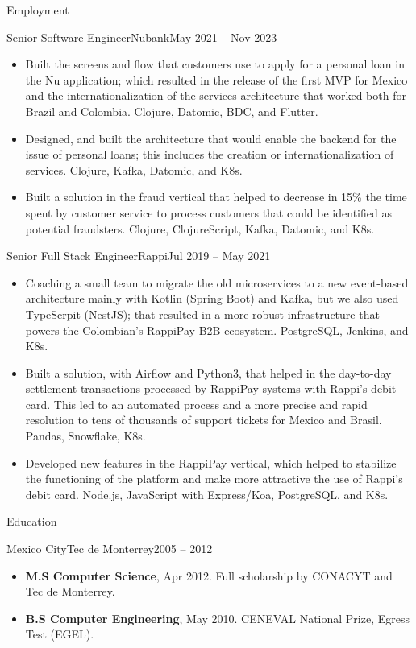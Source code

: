 \documentclass[calibri]{../mcdowell-cv/mcdowellcv}
\begin{document}
\begin{cvsection}{Employment}
		\begin{cvsubsection}{Senior Software Engineer}{Nubank}{May 2021 -- Nov 2023}
			\begin{itemize}
				\item Built the screens and flow that customers use to apply for a personal loan in the Nu application; which resulted in the release of the first MVP for Mexico and the internationalization of the services architecture that worked both for Brazil and Colombia. Clojure, Datomic, BDC, and Flutter.
				\item Designed, and built the architecture that would enable the backend for the issue of personal loans; this includes the creation or internationalization of services. Clojure, Kafka, Datomic, and K8s.
				\item Built a solution in the fraud vertical that helped to decrease in 15\% the time spent by customer service to process customers that could be identified as potential fraudsters. Clojure, ClojureScript, Kafka, Datomic, and K8s.
			\end{itemize}
		\end{cvsubsection}

		\begin{cvsubsection}{Senior Full Stack Engineer}{Rappi}{Jul 2019 -- May 2021}
			\begin{itemize}
				\item Coaching a small team to migrate the old microservices to a new event-based architecture mainly with Kotlin (Spring Boot) and Kafka, but we also used TypeScrpit (NestJS); that resulted in a more robust infrastructure that powers the Colombian's RappiPay B2B ecosystem. PostgreSQL, Jenkins, and K8s.
				\item Built a solution, with Airflow and Python3, that helped in the day-to-day settlement transactions processed by RappiPay systems with Rappi's debit card. This led to an automated process and a more precise and rapid resolution to tens of thousands of support tickets for Mexico and Brasil. Pandas, Snowflake, K8s.
				\item Developed new features in the RappiPay vertical, which helped to stabilize the functioning of the platform and make more attractive the use of Rappi's debit card. Node.js, JavaScript with Express/Koa, PostgreSQL, and K8s.
			\end{itemize}
		\end{cvsubsection}
	\end{cvsection}
	
	\begin{cvsection}{Education}
		\begin{cvsubsection}{Mexico City}{Tec de Monterrey}{2005 -- 2012}
			\begin{itemize}
				\item \textbf{M.S Computer Science}, Apr 2012. Full scholarship by CONACYT and Tec de Monterrey.
				\item \textbf{B.S Computer Engineering}, May 2010. CENEVAL National Prize, Egress Test (EGEL).
			\end{itemize}
		\end{cvsubsection}
	\end{cvsection}
	
\end{document}
